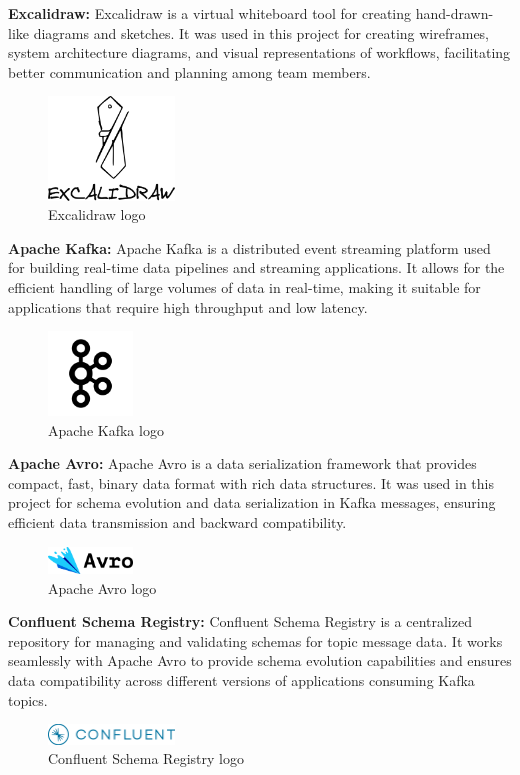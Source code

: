 \textbf{Excalidraw:}
Excalidraw is a virtual whiteboard tool for creating hand-drawn-like diagrams and sketches. It was used in this project for creating wireframes, system architecture diagrams, and visual representations of workflows, facilitating better communication and planning among team members.
\begin{figure}[H]
\centering
\includegraphics[width=0.3\textwidth]{img/logos/excalidraw-logo.png}
\caption{Excalidraw logo}
\end{figure}

\textbf{Apache Kafka:}
Apache Kafka is a distributed event streaming platform used for building real-time data pipelines and streaming applications. It allows for the efficient handling of large volumes of data in real-time, making it suitable for applications that require high throughput and low latency.
\begin{figure}[H]
\centering
\includegraphics[width=0.2\textwidth]{img/tech/kafka-logo.png}
\caption{Apache Kafka logo}
\end{figure}

\textbf{Apache Avro:}
Apache Avro is a data serialization framework that provides compact, fast, binary data format with rich data structures. It was used in this project for schema evolution and data serialization in Kafka messages, ensuring efficient data transmission and backward compatibility.
\begin{figure}[H]
\centering
\includegraphics[width=0.2\textwidth]{img/tech/apache-avro-logo.png}
\caption{Apache Avro logo}
\end{figure}

\textbf{Confluent Schema Registry:}
Confluent Schema Registry is a centralized repository for managing and validating schemas for topic message data. It works seamlessly with Apache Avro to provide schema evolution capabilities and ensures data compatibility across different versions of applications consuming Kafka topics.
\begin{figure}[H]
\centering
\includegraphics[width=0.3\textwidth]{img/tech/CFLT_BIG.png}
\caption{Confluent Schema Registry logo}
\end{figure}